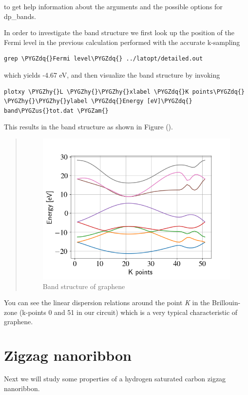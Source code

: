 \documentclass[a4paper,11pt,english]{sphinxmanual}
\def\PYGZus{\char`\_}
\def\PYGZam{\char`\&}
\def\PYGZhy{\char`\-}
\def\PYGZdq{\char`\"}
\begin{document}
{{to get help information about the arguments and the possible options
for dp\_bands.

In order to investigate the band structure we first look up the
position of the Fermi level in the previous calculation performed with
the accurate k-sampling

\begin{Verbatim}[commandchars=\\\{\}]
grep \PYGZdq{}Fermi level\PYGZdq{} ../latopt/detailed.out
\end{Verbatim}

which yields -4.67 eV, and then visualize the band structure by
invoking

\begin{Verbatim}[commandchars=\\\{\}]
plotxy \PYGZhy{}L \PYGZhy{}\PYGZhy{}xlabel \PYGZdq{}K points\PYGZdq{} \PYGZhy{}\PYGZhy{}ylabel \PYGZdq{}Energy [eV]\PYGZdq{} band\PYGZus{}tot.dat \PYGZam{}
\end{Verbatim}

This results in the band structure as shown in Figure
{\hyperref[electstruct:fig-graphene-band]{\emph{}}} ().
\begin{quote}
\begin{figure}[htbp]
\centering
\capstart

\includegraphics[width=0.650\linewidth]{graphene-band.png}
\caption{Band structure of graphene}\label{electstruct:fig-graphene-band}\end{figure}
\end{quote}

You can see the linear dispersion relations around the point \emph{K} in
the Brillouin-zone (k-points 0 and 51 in our circuit) which is a very
typical characteristic of graphene.


\section{Zigzag nanoribbon}
\label{electstruct:zigzag-nanoribbon}
Next we will study some properties of a hydrogen saturated carbon
zigzag nanoribbon.


}}
\end{document}
